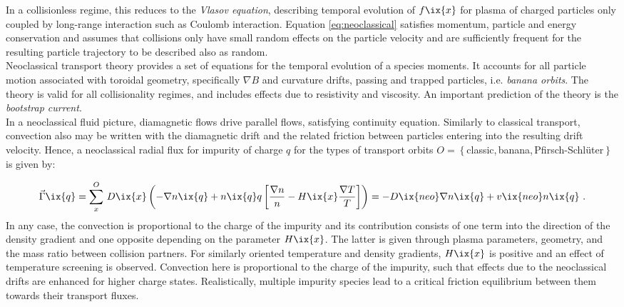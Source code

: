 %
                In a collisionless regime, this reduces to the \textit{Vlasov equation}, describing temporal evolution of $f\ix{x}$ for plasma of charged particles only coupled by long-range interaction such as Coulomb interaction\cite{WikiVlasov}. Equation \ref{eq:neoclassical} satisfies momentum, particle and energy conservation and assumes that collisions only have small random effects on the particle velocity and are sufficiently frequent for the resulting particle trajectory to be described also as random.\\%
                Neoclassical transport theory provides a set of equations for the temporal evolution of a species moments. It accounts for all particle motion associated with toroidal geometry, specifically $\nabla B$ and curvature drifts, passing and trapped particles, i.e. \textit{banana orbits}. The theory is valid for all collisionality regimes, and includes effects due to resistivity and viscosity. An important prediction of the theory is the \textit{bootstrap current}\cite{Houlberg1997,Tribaldos2005,Fulop2001}.\\%
                In a neoclassical fluid picture, diamagnetic flows drive parallel flows, satisfying continuity equation. Similarly to classical transport, convection also may be written with the diamagnetic drift and the related friction between particles entering into the resulting drift velocity. Hence, a neoclassical radial flux for impurity of charge $q$ for the types of transport orbits $O=\left\{\right.$classic,\,banana,\,Pfirsch-Schlüter$\left.\right\}$ is given by:

                \begin{align}%
                    \vec{\Gamma}\ix{q}=\sum^{O}_{x}\,D\ix{x}\left(-\nabla n\ix{q}+n\ix{q}q\left[\frac{\nabla n}{n}-H\ix{x}\frac{\nabla T}{T}\right]\right)=-D\ix{neo}\nabla n\ix{q}+v\ix{neo}n\ix{q}\,\,.\nonumber%
                \end{align}%
%
                In any case, the convection is proportional to the charge of the impurity and its contribution consists of one term into the direction of the density gradient and one opposite depending on the parameter $H\ix{x}$. The latter is given through plasma parameters, geometry, and the mass ratio between collision partners. For similarly oriented temperature and density gradients, $H\ix{x}$ is positive and an effect of temperature screening is observed. Convection here is proportional to the charge of the impurity, such that effects due to the neoclassical drifts are enhanced for higher charge states. Realistically, multiple impurity species lead to a critical friction equilibrium between them towards their transport fluxes\cite{Dux2000,Dux2004}.%
%
